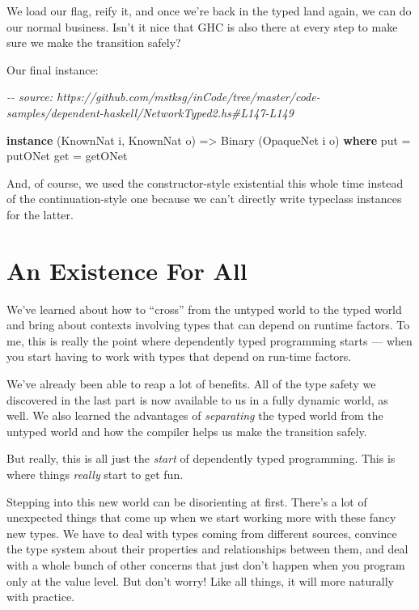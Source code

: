 \documentclass[]{article}
\newenvironment{Shaded}{}{}
\newcommand{\CommentTok}[1]{\textcolor[rgb]{0.38,0.63,0.69}{\textit{#1}}}
\newcommand{\DataTypeTok}[1]{\textcolor[rgb]{0.56,0.13,0.00}{#1}}
\newcommand{\KeywordTok}[1]{\textcolor[rgb]{0.00,0.44,0.13}{\textbf{#1}}}
\newcommand{\NormalTok}[1]{#1}
\newcommand{\OtherTok}[1]{\textcolor[rgb]{0.00,0.44,0.13}{#1}}
\begin{document}
We load our flag, reify it, and once we're back in the typed land again, we can
do our normal business. Isn't it nice that GHC is also there at every step to
make sure we make the transition safely?

Our final instance:

\begin{Shaded}
\begin{Highlighting}[]
\CommentTok{{-}{-} source: https://github.com/mstksg/inCode/tree/master/code{-}samples/dependent{-}haskell/NetworkTyped2.hs\#L147{-}L149}

\KeywordTok{instance}\NormalTok{ (}\DataTypeTok{KnownNat}\NormalTok{ i, }\DataTypeTok{KnownNat}\NormalTok{ o) }\OtherTok{=\textgreater{}} \DataTypeTok{Binary}\NormalTok{ (}\DataTypeTok{OpaqueNet}\NormalTok{ i o) }\KeywordTok{where}
\NormalTok{    put }\OtherTok{=}\NormalTok{ putONet}
\NormalTok{    get }\OtherTok{=}\NormalTok{ getONet}
\end{Highlighting}
\end{Shaded}

And, of course, we used the constructor-style existential this whole time
instead of the continuation-style one because we can't directly write typeclass
instances for the latter.

\section{An Existence For All}\label{an-existence-for-all}

We've learned about how to ``cross'' from the untyped world to the typed world
and bring about contexts involving types that can depend on runtime factors. To
me, this is really the point where dependently typed programming starts --- when
you start having to work with types that depend on run-time factors.

We've already been able to reap a lot of benefits. All of the type safety we
discovered in the last part is now available to us in a fully dynamic world, as
well. We also learned the advantages of \emph{separating} the typed world from
the untyped world and how the compiler helps us make the transition safely.

But really, this is all just the \emph{start} of dependently typed programming.
This is where things \emph{really} start to get fun.

Stepping into this new world can be disorienting at first. There's a lot of
unexpected things that come up when we start working more with these fancy new
types. We have to deal with types coming from different sources, convince the
type system about their properties and relationships between them, and deal with
a whole bunch of other concerns that just don't happen when you program only at
the value level. But don't worry! Like all things, it will more naturally with
practice.
\end{document}
